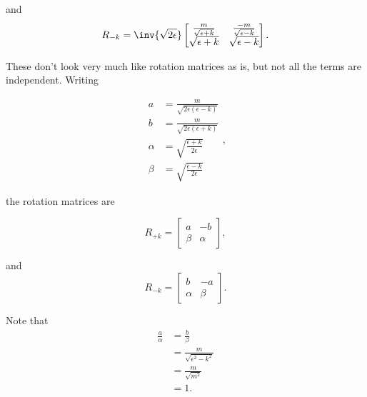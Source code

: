 and
\begin{dmath}\label{eqn:gradQuantumProblemSet4Problem3:280}
R_{-k} 
= 
\inv{\sqrt{2\epsilon}}
\begin{bmatrix}
\frac{m}{\sqrt{\epsilon + k}} & \frac{-m}{\sqrt{\epsilon - k}} \\
\sqrt{\epsilon + k} & \sqrt{\epsilon - k} 
\end{bmatrix}.
\end{dmath}

These don't look very much like rotation matrices as is, but not all the terms are independent.  Writing

\begin{dmath}\label{eqn:gradQuantumProblemSet4Problem3:300}
\begin{aligned}
a &= \frac{m}{\sqrt{2\epsilon(\epsilon - k)}}  \\
b &= \frac{m}{\sqrt{2\epsilon(\epsilon + k)}} \\
\alpha &= \sqrt{\frac{\epsilon + k}{2 \epsilon}}  \\
\beta &= \sqrt{\frac{\epsilon - k}{2 \epsilon}} 
\end{aligned},
\end{dmath}

the rotation matrices are

\begin{dmath}\label{eqn:gradQuantumProblemSet4Problem3:320}
R_{+k} 
= 
\begin{bmatrix}
a & - b \\
\beta & \alpha
\end{bmatrix},
\end{dmath}

and
\begin{dmath}\label{eqn:gradQuantumProblemSet4Problem3:340}
R_{-k} 
= 
\begin{bmatrix}
b & -a \\
\alpha & \beta
\end{bmatrix}.
\end{dmath}

Note that 
\begin{equation}\label{eqn:gradQuantumProblemSet4Problem3:360}
\begin{aligned}
\frac{a}{\alpha} &= \frac{b}{\beta} \\
&= \frac{m}{\sqrt{\epsilon^2 - k^2}}  \\
&= \frac{m}{\sqrt{m^2}}  \\
&= 1.
\end{aligned}
\end{equation}

